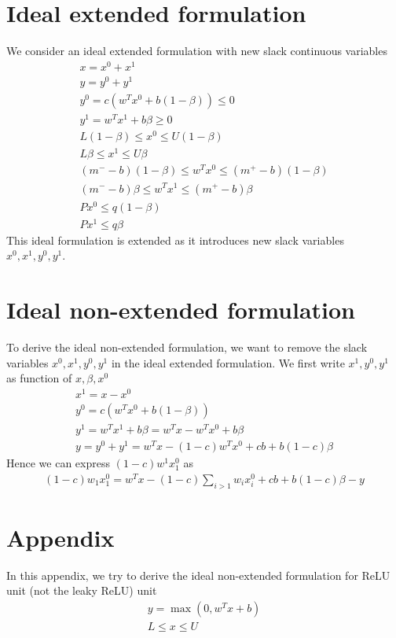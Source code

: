 \documentclass{article}
\begin{document}
\section{Ideal extended formulation}
We consider an ideal extended formulation with new slack continuous variables
\begin{subequations}
\begin{align}
	x = x^0 + x^1\\
	y = y^0 + y^1\\
	y^0 = c(w^Tx^0 + b(1-\beta)) \le 0\\
	y^1 = w^Tx^1 + b\beta\ge 0\\
	L(1-\beta) \le x^0 \le U(1-\beta)\\
	L\beta \le x^1 \le U\beta\\
	(m^--b)(1-\beta) \le w^Tx^0\le(m^+-b)(1-\beta)\\
	(m^--b)\beta \le w^Tx^1\le(m^+-b)\beta\\
	Px^0\le q(1-\beta)\\
	Px^1\le q\beta
\end{align}
\end{subequations}
This ideal formulation is extended as it introduces new slack variables $x^0, x^1, y^0, y^1$.

\section{Ideal non-extended formulation}
To derive the ideal non-extended formulation, we want to remove the slack variables $x^0, x^1, y^0, y^1$ in the ideal extended formulation. We first write $x^1, y^0, y^1$ as function of $x, \beta, x^0$
\begin{subequations}
\begin{align}
	x^1 = x - x^0\\
	y^0 = c(w^Tx^0 + b(1-\beta))\\
	y^1 = w^Tx^1 + b\beta = w^Tx - w^Tx^0 + b\beta\\
	y = y^0 + y^1 = w^Tx - (1-c)w^Tx^0 + cb + b(1-c)\beta
\end{align}
\end{subequations}
Hence we can express $(1-c)w^1x^0_1$ as
\begin{align}
	(1-c)w_1x^0_1 = w^Tx - (1-c)\sum_{i>1}w_ix^0_i + cb  + b(1-c)\beta - y
\end{align}



\section{Appendix}
In this appendix, we try to derive the ideal non-extended formulation for ReLU unit (not the leaky ReLU) unit 
\begin{subequations}
\begin{align}
	y = \max(0, w^Tx + b)\\
	L \le x \le U
\end{align}
\end{subequations}
\end{document}
